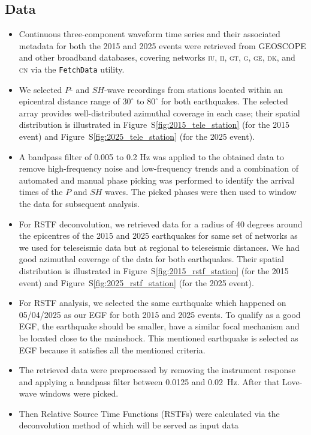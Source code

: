 \subsection{Data}
\begin{itemize}
    \item Continuous three-component waveform time series and their associated metadata for both the 2015 and 2025 events were retrieved from GEOSCOPE and
 other broadband databases, covering networks \textsc{iu}, \textsc{ii}, \textsc{gt}, \textsc{g}, \textsc{ge}, \textsc{dk}, and \textsc{cn} via the \texttt{FetchData}
  utility.
    \item We selected $P$- and $SH$-wave recordings from stations located within an epicentral distance range of $30^\circ$ to $80^\circ$ for both earthquakes.
     The selected array provides well-distributed azimuthal coverage in each case; their spatial distribution is illustrated in 
     Figure~S\ref{fig:2015_tele_station} (for the 2015 event) and Figure~S\ref{fig:2025_tele_station} (for the 2025 event).
    \item A bandpass filter of 0.005 to 0.2 Hz was applied to the obtained data to remove high-frequency noise and low-frequency trends and a combination of
     automated and manual phase picking was performed to identify the arrival times of the $P$ and $SH$ waves. The picked phases were then used to window the 
     data for subsequent analysis. 
    \item For RSTF deconvolution, we retrieved data for a radius of 40 degrees around the epicentres of the 2015 and 2025 earthquakes for same set of networks
    as we used for teleseismic data but at regional to teleseismic distances. We had good azimuthal coverage of the data for both earthquakes. Their spatial 
    distribution is illustrated in Figure~S\ref{fig:2015_rstf_station} (for the 2015 event) and Figure~S\ref{fig:2025_rstf_station} (for the 2025 event).
    \item For RSTF analysis, we selected the same earthquake which happened on 05/04/2025 as our EGF for both 2015 and 2025 events. To qualify as a good EGF, the earthquake should be 
    smaller, have a similar focal mechanism and be located close to the mainshock. This mentioned earthquake is selected as EGF because it satisfies all the
    mentioned criteria.
    \item The retrieved data were preprocessed by removing the instrument response and applying a bandpass filter between 0.0125 and 0.02~Hz. After that
    Love-wave windows were picked. 
    \item Then Relative Source Time Functions (RSTFs) were calculated via the deconvolution method of \cite{RSTFVallée2004} which will be served as input data

\end{itemize}
